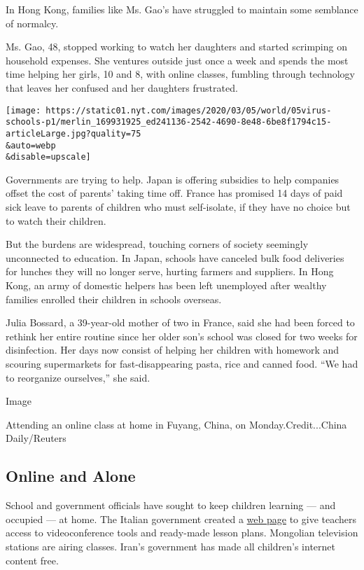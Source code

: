 In Hong Kong, families like Ms. Gao's have struggled to maintain some
semblance of normalcy.

Ms. Gao, 48, stopped working to watch her daughters and started
scrimping on household expenses. She ventures outside just once a week
and spends the most time helping her girls, 10 and 8, with online
classes, fumbling through technology that leaves her confused and her
daughters frustrated.

\texttt{[image: https://static01.nyt.com/images/2020/03/05/world/05virus-schools-p1/merlin\_169931925\_ed241136-2542-4690-8e48-6be8f1794c15-articleLarge.jpg?quality=75\\\&auto=webp\\\&disable=upscale]}

Governments are trying to help. Japan is offering subsidies to help
companies offset the cost of parents' taking time off. France has
promised 14 days of paid sick leave to parents of children who must
self-isolate, if they have no choice but to watch their children.

But the burdens are widespread, touching corners of society seemingly
unconnected to education. In Japan, schools have canceled bulk food
deliveries for lunches they will no longer serve, hurting farmers and
suppliers. In Hong Kong, an army of domestic helpers has been left
unemployed after wealthy families enrolled their children in schools
overseas.

Julia Bossard, a 39-year-old mother of two in France, said she had been
forced to rethink her entire routine since her older son's school was
closed for two weeks for disinfection. Her days now consist of helping
her children with homework and scouring supermarkets for
fast-disappearing pasta, rice and canned food. ``We had to reorganize
ourselves,'' she said.

Image

Attending an online class at home in Fuyang, China, on
Monday.Credit...China Daily/Reuters

\hypertarget{online-and-alone}{%
\subsection{Online and Alone}\label{online-and-alone}}

School and government officials have sought to keep children learning
--- and occupied --- at home. The Italian government created a
\href{https://www.istruzione.it/coronavirus/didattica-a-distanza.html}{web
page} to give teachers access to videoconference tools and ready-made
lesson plans. Mongolian television stations are airing classes. Iran's
government has made all children's internet content free.

